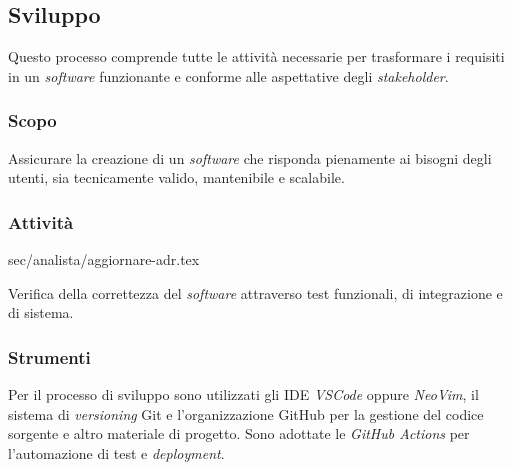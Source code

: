 \subsection{Sviluppo}

Questo processo comprende tutte le attività necessarie per trasformare i
requisiti in un \textit{software} funzionante e conforme alle aspettative degli
\textit{stakeholder}.

\subsubsection{Scopo}
Assicurare la creazione di un \textit{software} che risponda pienamente ai
bisogni degli utenti, sia tecnicamente valido, mantenibile e scalabile.

\subsubsection{Attività}

 {sec/analista/aggiornare-adr.tex}



 Verifica della correttezza del \textit{software}
	  attraverso test funzionali, di integrazione e di sistema.

\subsubsection{Strumenti}
Per il processo di sviluppo sono utilizzati gli IDE \textit{VSCode} oppure
\textit{NeoVim}, il sistema di \textit{versioning} Git e l'organizzazione {GitHub\g} per la gestione del codice
sorgente e altro materiale di progetto. Sono adottate le \textit{GitHub Actions}
per l'automazione di test e \textit{deployment}.
